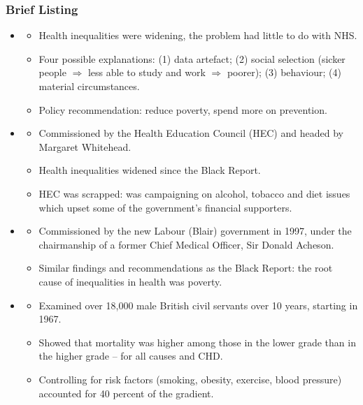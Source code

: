         \subsubsection{Brief Listing}
            \begin{itemize}
                \item {}
                \begin{itemize}
                    \item Health inequalities were widening, the problem had little to do with NHS.
                    \item Four possible explanations: (1) data artefact; (2) social selection (sicker people $\Rightarrow$ less able to study and work $\Rightarrow$ poorer); (3) behaviour; (4) material circumstances.
                    \item Policy recommendation: reduce poverty, spend more on prevention.
                \end{itemize} 
                
                \item {}
                \begin{itemize}
                    \item Commissioned by the Health Education Council (HEC) and headed by
        Margaret Whitehead.
                    \item Health inequalities widened since the Black Report.
                    \item HEC was scrapped: was campaigning on alcohol, tobacco and diet issues which upset some of the government’s financial supporters.
                \end{itemize}
                
                \item {}
                \begin{itemize}
                    \item Commissioned by the new Labour (Blair) government in 1997, under the chairmanship of a former Chief Medical Officer, Sir Donald Acheson.
                    \item Similar findings and recommendations as the Black Report: the root cause of inequalities in health was poverty.
                \end{itemize}
        
                \item {}
                \begin{itemize}
                    \item Examined over 18,000 male British civil servants over 10 years, starting in 1967.
                    \item Showed that mortality was higher among those in the lower grade than in the higher grade – for all causes and CHD.
                    \item Controlling for risk factors (smoking, obesity, exercise, blood pressure) accounted for 40 percent of the gradient.
                \end{itemize}
        

\end{itemize}

